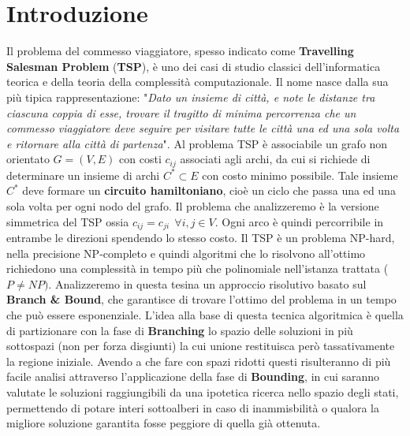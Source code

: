 \documentclass[
	article,			%
	12pt,				%
	oneside,			%
	a4paper,			%
	english,			%
	italian,				%
	sumario=tradicional,
	]{abntex2}
\begin{document}
\section{Introduzione}
Il problema del commesso viaggiatore, spesso indicato come \textbf{Travelling Salesman Problem} (\textbf{TSP}), è uno dei casi di studio classici dell'informatica teorica e della teoria della complessità computazionale. Il nome nasce dalla sua più tipica rappresentazione: "\textit{Dato un insieme di città, e note le distanze tra ciascuna coppia di esse, trovare il tragitto di minima percorrenza che un commesso viaggiatore deve seguire per visitare tutte le città una ed una sola volta e ritornare alla città di partenza}". Al problema TSP è associabile un grafo non orientato $G=(V,E)$ con costi $c_{ij}$ associati agli archi, da cui si richiede di determinare un insieme di archi $C^* \subset E$ con costo minimo possibile. Tale insieme $C^*$ deve formare un \textbf{circuito hamiltoniano}, cioè un ciclo che passa una ed una sola volta per ogni nodo del grafo. Il problema che analizzeremo è la versione simmetrica del TSP ossia $c_{ij} = c_{ji} \:\: \forall i,j \in V$. Ogni arco è quindi percorribile in entrambe le direzioni spendendo lo stesso costo.
\newline
Il TSP è un problema NP-hard, nella precisione NP-completo e quindi algoritmi che lo risolvono all'ottimo richiedono una complessità in tempo più che polinomiale nell'istanza trattata ($P \neq NP)$.
\newline
Analizzeremo in questa tesina un approccio risolutivo basato sul \textbf{Branch \& Bound}, che garantisce di trovare l'ottimo del problema in un tempo che può essere esponenziale. L'idea alla base di questa tecnica algoritmica è quella di partizionare con la fase di \textbf{Branching} lo spazio delle soluzioni in più sottospazi (non per forza disgiunti) la cui unione restituisca però tassativamente la regione iniziale. Avendo a che fare con spazi ridotti questi risulteranno di più facile analisi attraverso l'applicazione della fase di \textbf{Bounding}, in cui saranno valutate le soluzioni raggiungibili da una ipotetica ricerca nello spazio degli stati, permettendo di potare interi sottoalberi in caso di inammisbilità o qualora la migliore soluzione garantita fosse peggiore di quella già ottenuta.
\end{document}
